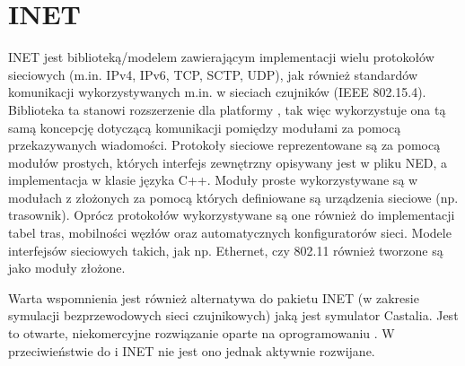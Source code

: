 \section{INET}
INET jest biblioteką/modelem zawierającym implementacji wielu protokołów sieciowych (m.in. IPv4, IPv6, TCP, SCTP, UDP), jak również standardów komunikacji wykorzystywanych m.in. w sieciach czujników (IEEE 802.15.4)\cite{inet}. Biblioteka ta stanowi rozszerzenie dla platformy \omnetpp, tak więc wykorzystuje ona tą samą koncepcję dotyczącą komunikacji pomiędzy modułami za pomocą przekazywanych wiadomości. Protokoły sieciowe reprezentowane są za pomocą modułów prostych, których interfejs zewnętrzny opisywany jest w pliku NED, a implementacja w klasie języka C++. Moduły proste wykorzystywane są w modułach z złożonych za pomocą których definiowane są urządzenia sieciowe (np. trasownik). Oprócz protokołów wykorzystywane są one również do implementacji tabel tras, mobilności węzłów oraz automatycznych konfiguratorów sieci. Modele interfejsów sieciowych takich, jak np. Ethernet, czy 802.11 również tworzone są jako moduły złożone.

Warta wspomnienia jest również alternatywa do pakietu INET (w zakresie symulacji bezprzewodowych sieci czujnikowych) jaką jest symulator Castalia. Jest to otwarte, niekomercyjne rozwiązanie oparte na oprogramowaniu \omnetpp. W przeciwieństwie do \omnetpp i INET nie jest ono jednak aktywnie rozwijane. 
